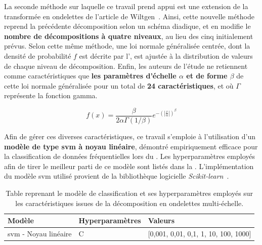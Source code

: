 La seconde méthode sur laquelle ce travail prend appui est une extension de la transformée en ondelettes de l'article de Wiltgen~. Ainsi, cette nouvelle méthode reprend la précédente décomposition selon un schéma diadique, et en modifie le \textbf{nombre de décompositions à quatre niveaux}, au lieu des cinq initialement prévus. Selon cette même méthode, une loi normale généralisée centrée, dont la densité de probabilité $f$ est décrite par l', est ajustée à la distribution de valeurs de chaque niveau de décomposition. Enfin, les auteurs de l'étude ne retiennent comme caractéristiques que \textbf{les paramètres d'échelle $\alpha$ et de forme $\beta$} de cette loi normale généralisée pour un total de \textbf{24 caractéristiques}, et où $\Gamma$ représente la fonction gamma.\par

\begin{equation}
    f(x)= \frac{\beta}{2\alpha\Gamma(1/\beta)} e^{-\left(|\frac{x}{\alpha}|\right)^\beta}
    \label{eq:image_improvement_ggd}
\end{equation}

Afin de gérer ces diverses caractéristiques, ce travail s'emploie à l'utilisation d'un \textbf{modèle de type \gls{svm} à noyau linéaire}, démontré empiriquement efficace pour la classification de données fréquentielles lors du . Les hyperparamètres employés afin de tirer le meilleur parti de ce modèle sont listés dans la . L'implémentation du modèle \gls{svm} utilisé provient de la bibliothèque logicielle \textit{Scikit-learn}~\cite{pedregosa2011}.\par

\begin{table}[H]
    \centering
    \begin{tabular}{lll}
        \toprule
        \textbf{Modèle}                                 & \textbf{Hyperparamètres}  & \textbf{Valeurs}                          \\ \midrule
        \gls{svm} - Noyau linéaire                      & C                         & [0,001, 0,01, 0,1, 1, 10, 100, 1000]      \\ 
        \bottomrule 
    \end{tabular} 
    \caption{Table reprenant le modèle de classification et ses hyperparamètres employés sur les caractéristiques issues de la décomposition en ondelettes multi-échelle.}
    \label{tab:parameters_image_improvement_multiscale_frequency}
\end{table}\par

